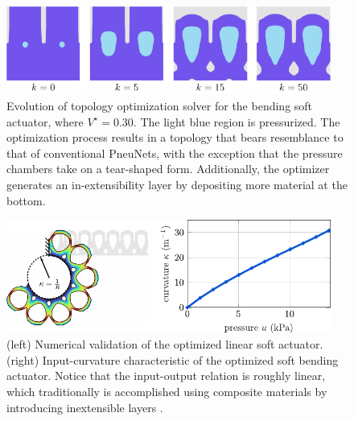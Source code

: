\begin{figure}[!t]
\centering
\includegraphics*[width=0.95\textwidth]{./pdf/thesis-figure-3-2.pdf}
\caption{Evolution of topology optimization solver for the bending soft actuator, where $V^\star = 0.30$. The light blue region is pressurized. The optimization process results in a topology that bears resemblance to that of conventional PneuNets, with the exception that the pressure chambers take on a tear-shaped form. Additionally, the optimizer generates an in-extensibility layer by depositing more material at the bottom. }
\label{fig:topo_result}\end{figure}

\begin{figure}[!t]
  \centering
  \includegraphics*[width=0.95\textwidth]{./pdf/thesis-figure-3-5.pdf}
  \caption{(left) Numerical validation of the optimized linear soft actuator. (right) Input-curvature characteristic of the optimized soft bending actuator. Notice that the input-output relation is roughly linear, which traditionally is accomplished using composite materials by introducing inextensible layers \cite{Polygerinos2013,Polygerinos2015}.}
  \label{fig:topo_result_bellow_fem}
\end{figure}

